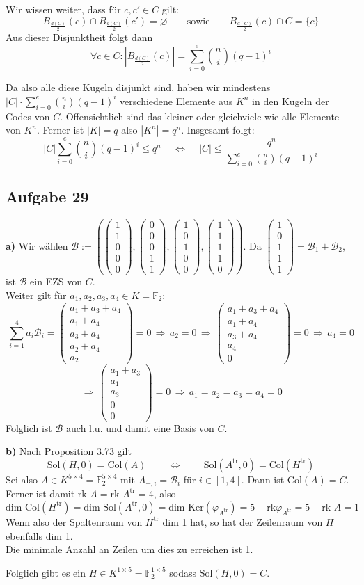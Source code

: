 \documentclass[a4paper,graphics,11pt]{article}
\newcommand{\aufgabe}[1]{\subsection*{Aufgabe #1}}
\newcommand{\vect}[5]{\begin{pmatrix}#1\\#2\\#3\\#4\\#5\end{pmatrix}}
\begin{document}
Wir wissen weiter, dass für $c,c' \in C$ gilt:
$$
    B_{\frac{d(C)}{2}}(c) \cap B_{\frac{d(C)}{2}}(c') = \varnothing
    \qquad\text{sowie}\qquad
    B_{\frac{d(C)}{2}}(c) \cap C = \{c\}
$$
Aus dieser Disjunktheit folgt dann
$$
    \forall c \in C : |B_{\frac{d(C)}{2}}(c)| = \sum_{i=0}^{e} \binom{n}{i}(q-1)^i
$$

\newpage

Da also alle diese Kugeln disjunkt sind, haben wir mindestens $|C| \cdot \sum_{i=0}^{e} \binom{n}{i}(q-1)^i$
verschiedene Elemente aus $K^n$ in den Kugeln der Codes von $C$. Offensichtlich sind das kleiner oder gleichviele
wie alle Elemente von $K^n$. Ferner ist $|K| = q$ also $|K^n| = q^n$. Insgesamt folgt:
$$
    |C|\sum_{i=0}^{e} \binom{n}{i}(q-1)^i \leq q^n
    \quad\,\Longleftrightarrow\,\quad
    |C| \leq \frac{q^n}{\sum_{i=0}^{e} \binom{n}{i}(q-1)^i}
$$

\aufgabe{29}

\textbf{a)}
Wir wählen $\mathcal{B} := (\vect{1}{1}{0}{0}{0},\vect{0}{0}{0}{1}{1},\vect{1}{0}{1}{0}{0},\vect{1}{1}{1}{1}{0})$.
Da $\vect{1}{0}{1}{1}{1} = \mathcal{B}_1 + \mathcal{B}_2$, ist $\mathcal{B}$ ein EZS von $C$.\\
Weiter gilt für $a_1,a_2,a_3,a_4 \in K = \mathbb{F}_2:$
$$
    \sum_{i=1}^{4} a_i\mathcal{B}_i = \vect{a_1+a_3+a_4}{a_1+a_4}{a_3+a_4}{a_2+a_4}{a_2} = 0
    \,\Longrightarrow\, a_2 = 0
    \,\Longrightarrow\, \vect{a_1+a_3+a_4}{a_1+a_4}{a_3+a_4}{a_4}{0} = 0
    \,\Longrightarrow\, a_4 = 0
$$$$
    \,\Longrightarrow\, \vect{a_1+a_3}{a_1}{a_3}{0}{0} = 0
    \,\Longrightarrow\, a_1 = a_2 = a_3 = a_4 = 0
$$
Folglich ist $\mathcal{B}$ auch l.u. und damit eine Basis von $C$.

\textbf{b)}
Nach Proposition 3.73 gilt
$$
    \text{Sol}(H,0) = \text{Col}(A)
    \qquad\,\Longleftrightarrow\,\qquad
    \text{Sol}(A^{\text{tr}},0) = \text{Col}(H^{\text{tr}})
$$
Sei also $A \in K^{5\times 4} = \mathbb{F}_2^{5\times 4}$ mit $A_{-,i} = \mathcal{B}_i$ für $i \in [1,4]$.
Dann ist Col$(A) = C$.\\
Ferner ist damit rk $A = \text{rk } A^\text{tr} = 4$, also
$$
    \text{dim Col}(H^{\text{tr}}) = \text{dim Sol}(A^{\text{tr}}, 0) = \text{dim Ker}(\varphi_{A^{\text{tr}}}) = 5 - 
    \text{rk} \varphi_{A^{\text{tr}}} = 5 - \text{rk } A = 1
$$
Wenn also der Spaltenraum von $H^\text{tr}$ dim 1 hat, so hat der Zeilenraum von $H$ ebenfalls dim 1.\\
Die minimale Anzahl an Zeilen um dies zu erreichen ist 1.

Folglich gibt es ein $H \in K^{1\times 5} = \mathbb{F}_2^{1\times 5}$ sodass Sol$(H, 0) = C$.
\end{document}
